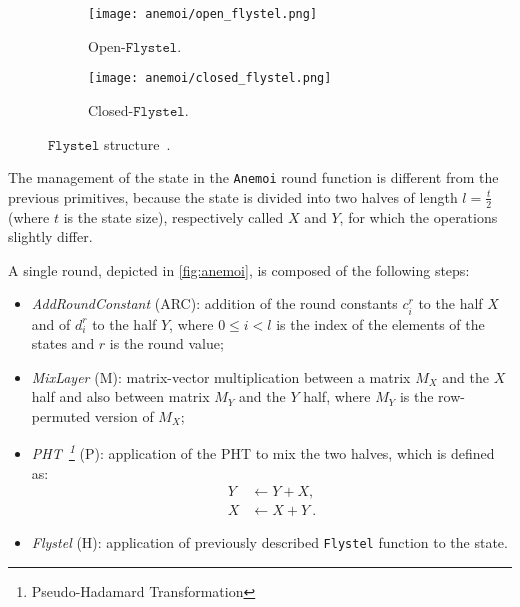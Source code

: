 \documentclass[12pt, a4paper]{report}
\begin{document}
\begin{figure}[H]
  \begin{center}
    \hspace{0.5cm}
    \begin{subfigure}{0.40\textwidth}
      \centering
      \texttt{[image: anemoi/open\_flystel.png]}
      \caption{Open-$\texttt{Flystel}$.}\label{subfig:openflystel}
    \end{subfigure}
    \hfill
    \begin{subfigure}{0.40\textwidth}
      \centering
      \texttt{[image: anemoi/closed\_flystel.png]}
      \caption{Closed-$\texttt{Flystel}$.}\label{subfig:closedflystel}
    \end{subfigure}
    \hspace{0.5cm}
  \end{center}
  \caption{$\texttt{Flystel}$ structure~\cite[Fig.~3]{anemoi}.}\label{fig:flystel}
\end{figure}

The management of the state in the \texttt{Anemoi} round function is different from the previous primitives, because the state is divided into two halves of length $l = \frac{t}{2}$ (where $t$ is the state size), respectively called $X$ and $Y$, for which the operations slightly differ.

A single round, depicted in \autoref{fig:anemoi},  is composed of the following steps:
\begin{itemize}
  \item \textit{AddRoundConstant} (ARC): addition of the round constants $c^r_i$ to the half $X$ and of $d^r_i$ to the half $Y$, where $0 \le i < l$ is the index of the elements of the states and $r$ is the round value;
  \item \textit{MixLayer} (M): matrix-vector multiplication between a matrix $M_X$ and the $X$ half and also between matrix $M_Y$ and the $Y$ half, where $M_Y$ is the row-permuted version of $M_X$;
  \item \textit{PHT~\footnote{Pseudo-Hadamard Transformation}} (P): application of the PHT to mix the two halves, which is defined as:
      \begin{align}
        Y &\leftarrow Y + X, \\
        X &\leftarrow X + Y\ .
        \label{eq:pht}
      \end{align}
    \item \textit{Flystel} (H): application of previously described \texttt{Flystel} function to the state.
\end{itemize}
\end{document}
